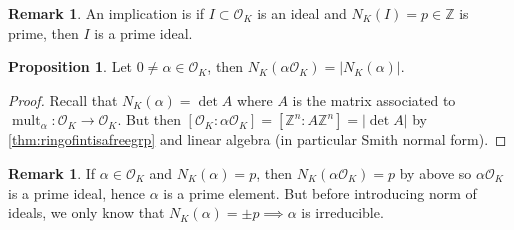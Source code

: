\documentclass{article}
\newcommand{\Z}{\mathbb{Z}}
\newcommand{\mult}{\operatorname{mult}}
\newcommand{\ri}{\mathcal{O}}
\theoremstyle{definition}
\newtheorem{prop}[defn]{Proposition}
\newtheorem{remark}[defn]{Remark}
\begin{document}
\begin{remark}
An implication is if $I\subset\ri_K$ is an ideal and $N_K(I)=p\in\Z$ is prime, then $I$ is a prime ideal.
\end{remark}

\begin{prop}
Let $0\neq\alpha\in\ri_K$, then $N_K(\alpha\ri_K)=|N_K(\alpha)|$.
\end{prop}
\begin{proof}
Recall that $N_K(\alpha)=\det A$ where $A$ is the matrix associated to $\mult_\alpha:\ri_K\rightarrow\ri_K$. But then $[\ri_K:\alpha\ri_K]=[\Z^n:A\Z^n]=|\det A|$ by \ref{thm:ringofintisafreegrp} and linear algebra (in particular Smith normal form).
\end{proof}

\begin{remark}
If $\alpha\in\ri_K$ and $N_K(\alpha)=p$, then $N_K(\alpha\ri_K)=p$ by above so $\alpha\ri_K$ is a prime ideal, hence $\alpha$ is a prime element. But before introducing norm of ideals, we only know that $N_K(\alpha)=\pm p\implies\alpha$ is irreducible.
\end{remark}
\end{document}

